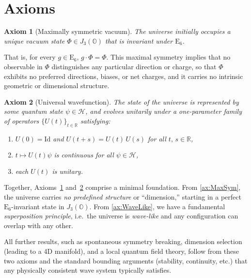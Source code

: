 \documentclass[pdflatex,sn-mathphys-num]{sn-jnl}
\theoremstyle{thmstyleone}
\newtheorem{axiom}[axiom]{Axiom}
\theoremstyle{thmstyletwo}%
\theoremstyle{thmstylethree}%
\newcommand{\E}[1]{\mathrm{E_{#1}}}
\newcommand{\ESix}{\E{6}}
\begin{document}
\section{Axioms}
\begin{axiom}[Maximally symmetric vacuum]
\label{ax:MaxSym}
The universe initially occupies a unique vacuum state $\Phi \in J_3(\mathbb{O})$ that is invariant under $\ESix$.
\end{axiom}
That is, for every $g \in \ESix$, $g \cdot \Phi = \Phi$. This maximal symmetry implies that no observable in $\Phi$ distinguishes any particular direction or charge, so that $\Phi$ exhibits no preferred directions, biases, or net charges, and it carries no intrinsic geometric or dimensional structure.

\begin{axiom}[Universal wavefunction]
\label{ax:WaveLike}
The state of the universe is represented by some quantum state $\psi\in\mathcal{H}$, and evolves unitarily under a one-parameter family of operators $\{U(t)\}_{t \in \mathbb{R}}$ satisfying:
\begin{enumerate}[label=\textup{(\roman*)}]
\item $U(0) = \mathrm{Id}$ and $U(t+s) = U(t)\,U(s)$ for all $t,\, s \in \mathbb{R}$,
\item $t \mapsto U(t)\psi$ is continuous for all $\psi \in \mathcal{H}$,
\item each $U(t)$ is unitary.
\end{enumerate}
\end{axiom}

Together, Axioms~\ref{ax:MaxSym} and~\ref{ax:WaveLike} comprise a minimal foundation. From \autoref{ax:MaxSym}, the universe carries \emph{no predefined structure} or “dimension,” starting in a perfect $\ESix$-invariant state in $J_3(\mathbb{O})$. From \autoref{ax:WaveLike}, we have a fundamental \emph{superposition principle}, i.e.\ the universe is \emph{wave-like} and any configuration can overlap with any other.

All further results, such as spontaneous symmetry breaking, dimension selection (leading to a 4D manifold), and a local quantum field theory, follow from these two axioms and the standard bounding arguments (stability, continuity, etc.) that any physically consistent wave system typically satisfies.

\end{document}
